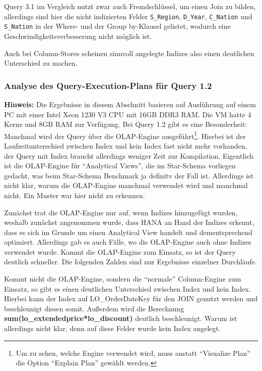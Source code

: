 Query 3.1 im Vergleich nutzt zwar auch Fremdschlüssel, um einen Join zu bilden,
allerdings sind hier die nicht indizierten Felder \verb+S_Region+, \verb+D_Year+,
\verb+C_Nation+ und \verb+S_Nation+ in der Where- und der Group by-Klausel gelistet,
wodurch eine Geschwindigkeitsverbesserung nicht möglich ist.

Auch bei Column-Stores scheinen sinnvoll angelegte Indizes also einen deutlichen Unterschied zu machen.

\subsubsection{Analyse des Query-Execution-Plans für Query 1.2}
\textbf{Hinweis:} Die Ergebnisse in diesem Abschnitt basieren auf Ausführung auf einem PC mit einer Intel Xeon 1230 V3 CPU mit 16GB DDR3 RAM. Die VM hatte 4 Kerne und 8GB RAM zur Verfügung.
Bei Query 1.2 gibt es eine Besonderheit: Manchmal wird der Query über die OLAP-Engine ausgeführt\footnote{Um zu sehen, welche Engine verwendet wird, muss anstatt \enquote{Visualize Plan} die Option \enquote{Explain Plan} gewählt werden.}. 
Hierbei ist der Laufzeitunterschied zwischen Index und kein Index fast nicht mehr vorhanden, der Query mit Index braucht allerdings weniger Zeit zur Kompilation. 
Eigentlich ist die OLAP-Engine für \enquote{Analytical Views}, die im Star-Schema vorliegen gedacht, was beim Star-Schema Benchmark ja definitv der Fall ist.
Allerdings ist nicht klar, warum die OLAP-Engine manchmal verwendet wird und manchmal nicht. Ein Muster war hier nicht zu erkennen. 


Zunächst trat die OLAP-Engine nur auf, wenn Indizes hinzugefügt wurden, weshalb zunächst angenommen wurde, dass HANA an Hand der Indizes erkennt, dass es sich im Grunde um einen Analytical View handelt und dementsprechend optimiert.
Allerdings gab es auch Fälle, wo die OLAP-Engine auch ohne Indizes verwendet wurde. Kommt die OLAP-Engine zum Einsatz, so ist der Query deutlich schneller. Die folgenden Zahlen sind nur Ergebnisse einzelner Durchläufe.

Kommt nicht die OLAP-Engine, sondern die \enquote{normale} Column-Engine zum Einsatz, so gibt es einen deutlichen Unterschied zwischen Index und kein Index. Hierbei kann der Index auf LO\_OrderDateKey für den JOIN genutzt werden und beschleunigt diesen somit.
Außerdem wird die Berechnung \textbf{sum(lo\_extendedprice*lo\_discount)} deutlich beschleunigt. Warum ist allerdings nicht klar, denn auf diese Felder wurde kein Index angelegt.

